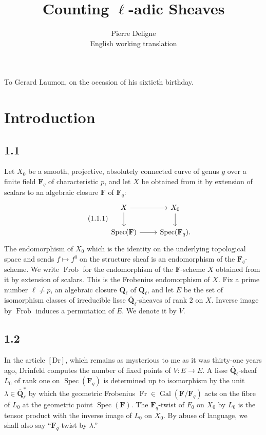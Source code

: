 \documentclass[11pt]{article}
\title{Counting \(\ell\)-adic Sheaves}
\author{Pierre Deligne\\English working translation}
\date{}
\newcommand{\Qbar}{\overline{\mathbf Q}}
\newcommand{\Ql}{\mathbf Q_\ell}
\newcommand{\Fq}{\mathbf F_q}
\newcommand{\F}{\mathbf F}
\newcommand{\Spec}{\operatorname{Spec}}
\newcommand{\Frob}{\operatorname{Frob}}
\newcommand{\Fr}{\operatorname{Fr}}
\newcommand{\Gal}{\operatorname{Gal}}
\begin{document}
\maketitle
\begin{center}
To Gerard Laumon, on the occasion of his sixtieth birthday.
\end{center}

\section{Introduction}

\subsection{1.1}
Let \(X_0\) be a smooth, projective, absolutely connected curve of genus \(g\) over a finite field \(\Fq\) of characteristic \(p\), and let \(X\) be obtained from it by extension of scalars to an algebraic closure \(\F\) of \(\Fq\):
\begin{equation}\tag{1.1.1}
\begin{tikzcd}
X \arrow[r] \arrow[d] & X_0 \arrow[d]\\
\Spec(\F) \arrow[r] & \Spec(\Fq).
\end{tikzcd}
\end{equation}
The endomorphism of \(X_0\) which is the identity on the underlying topological space and sends \(f\mapsto f^q\) on the structure sheaf is an endomorphism of the \(\Fq\)-scheme. We write \(\Frob\) for the endomorphism of the \(\F\)-scheme \(X\) obtained from it by extension of scalars. This is the Frobenius endomorphism of \(X\).
Fix a prime number \(\ell\ne p\), an algebraic closure \(\Qbar_\ell\) of \(\Ql\), and let \(E\) be the set of isomorphism classes of irreducible lisse \(\Qbar_\ell\)-sheaves of rank \(2\) on \(X\). Inverse image by \(\Frob\) induces a permutation of \(E\). We denote it by \(V\).

\subsection{1.2}
In the article \([\mathrm{Dr}]\), which remains as mysterious to me as it was thirty-one years ago, Drinfeld computes the number of fixed points of \(V:E\to E\).
A lisse \(\Qbar_\ell\)-sheaf \(L_0\) of rank one on \(\Spec(\Fq)\) is determined up to isomorphism by the unit \(\lambda\in\Qbar_\ell^*\) by which the geometric Frobenius \(\Fr\in\Gal(\F/\Fq)\) acts on the fibre of \(L_0\) at the geometric point \(\Spec(\F)\). The \(\Fq\)-twist of \(F_0\) on \(X_0\) by \(L_0\) is the tensor product with the inverse image of \(L_0\) on \(X_0\). By abuse of language, we shall also say ``\(\Fq\)-twist by \(\lambda\).''
\end{document}
